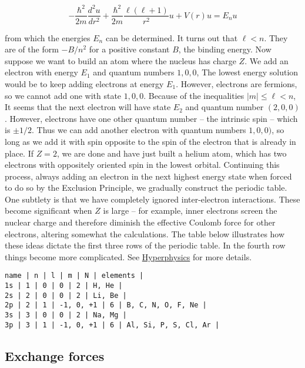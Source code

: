 \begin{equation}
- \frac{\hbar^2}{2m} \frac{ d^2 u}{ dr^2 }  
   + \frac{ \hbar^2 } { 2m } \frac{\ell(\ell + 1)}{ r^2 } u + V(r)u = E_n u
\end{equation}

from which the energies $E_n$ can be determined.  It turns out that $\ell < n$.  They are of the form $-B/n^2$ for a positive constant $B$, the binding energy.  Now suppose we want to build an atom where the nucleus has charge $Z$.  We add an electron with energy $E_1$ and quantum numbers $1,0,0$, The lowest energy solution would be to keep adding electrons at energy $E_1$.  However, electrons are fermions, so we cannot add one with state $1,0,0$.  Because of the inequalities $|m| \le \ell < n$, It seems that the next electron will have state $E_2$ and quantum number $(2,0,0)$. However, electrons have one other quantum number -- the intrinsic spin -- which is $\pm1/2$.  Thus we can add another electron with quantum numbers $1,0,0)$, so long as we add it with spin opposite to the spin of the electron that is already in place.  If $Z = 2$, we are done and have just built a helium atom, which has two electrons with oppositely oriented spin in the lowest orbital.  Continuing this process, always adding an electron in the next highest energy state when forced to do so by the Exclusion Principle, we gradually construct the periodic table.  One subtlety is that we have completely ignored inter-electron interactions.  These become significant when $Z$ is large -- for example, inner electrons screen the nuclear charge and therefore diminish the effective Coulomb force for other electrons, altering somewhat the calculations. The table below illustrates how these ideas dictate the first three rows of the periodic table. In the fourth row things become more complicated.  See \href{http://hyperphysics.phy-astr.gsu.edu/hbase/chemical/eleorb.html}{Hyperphysics} for more details.

\begin{verbatim}
name | n | l | m | N | elements |
1s | 1 | 0 | 0 | 2 | H, He |
2s | 2 | 0 | 0 | 2 | Li, Be |
2p | 2 | 1 | -1, 0, +1 | 6 | B, C, N, O, F, Ne |
3s | 3 | 0 | 0 | 2 | Na, Mg |
3p | 3 | 1 | -1, 0, +1 | 6 | Al, Si, P, S, Cl, Ar |
\end{verbatim}

\subsection{Exchange forces}

